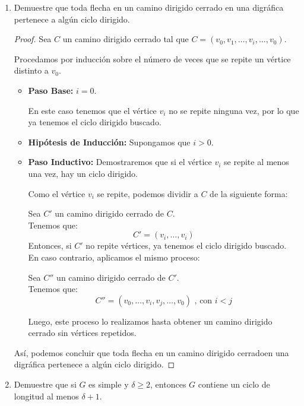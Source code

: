 \documentclass{article}
\begin{document}
\begin{enumerate}
  \small
\item Demuestre que toda flecha en un camino dirigido cerrado en una digr\'afica
  pertenece a alg\'un ciclo dirigido.

  \begin{proof}
    Sea $C$ un camino dirigido cerrado tal que $C = (v_{0}, v_{1}, \dots, v_{i},
    \dots, v_{0})$.

    Procedamos por inducción sobre el número de veces que se repite un vértice
    distinto a $v_{0}$.

    \begin{itemize}
      \item \textbf{Paso Base:} $i = 0$.

        En este caso tenemos que el vértice $v_{i}$ no se repite ninguna vez, por
        lo que ya tenemos el ciclo dirigido buscado.

      \item \textbf{Hipótesis de Inducción:} Supongamos que $i > 0$.

      \item \textbf{Paso Inductivo:} Demostraremos que si el vértice $v_{i}$ se
      repite al menos una vez, hay un ciclo dirigido.

        Como el vértice $v_{i}$ se repite, podemos dividir a $C$ de la siguiente forma:

        Sea $C'$ un camino dirigido cerrado de $C$. \\
        Tenemos que:
        $$C' = (v_{i}, \dots, v_{i})$$
        Entonces, si $C'$ no repite vértices, ya tenemos el ciclo dirigido buscado. \\
        En caso contrario, aplicamos el mismo proceso:

        Sea $C''$ un camino dirigido cerrado de $C'$. \\
        Tenemos que:
        $$C'' = (v_{0}, \dots, v_{i}, v_{j}, \dots, v_{0}) \text{ , con $i < j$}$$

        Luego, este proceso lo realizamos hasta obtener un camino dirigido cerrado
        sin vértices repetidos.
    \end{itemize}
    Así, podemos concluir que toda flecha en un camino dirigido cerradoen una digráfica
    pertenece a algún ciclo dirigido.
  \end{proof}

\item Demuestre que si $G$ es simple y $\delta \ge 2$, entonces $G$ contiene
  un ciclo de longitud al menos $\delta + 1$.


\end{enumerate}
\end{document}
